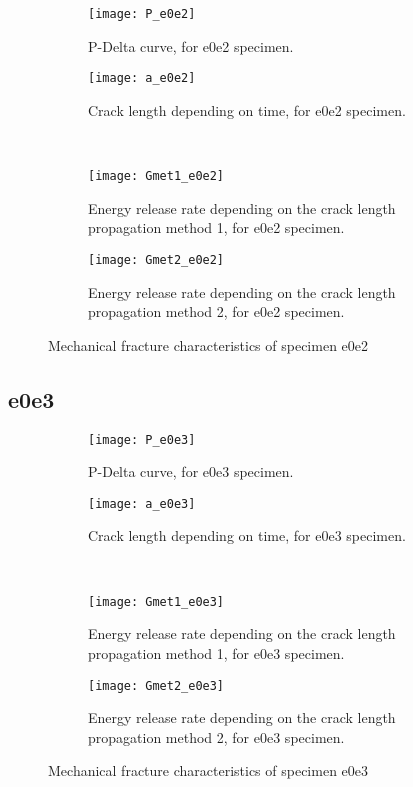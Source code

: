 \begin{figure}[H]
	\centering
	\begin{subfigure}{0.48\linewidth}
		\centering
		\texttt{[image: P\_e0e2]}
		\decoRule
		\caption{P-Delta curve, for e0e2 specimen.}
		\label{fig:P_e0e2}
	\end{subfigure}
	\hfill 
	\begin{subfigure}{0.48\linewidth}
		\centering
		\texttt{[image: a\_e0e2]}
		\decoRule
		\caption{Crack length depending on time, for e0e2 specimen.}
		\label{fig:a_e0e2}
	\end{subfigure}
	\hfill\\
	\begin{subfigure}{0.48\linewidth}
		\centering
		\texttt{[image: Gmet1\_e0e2]}
		\decoRule
		\caption{Energy release rate depending on the crack length propagation method 1, for e0e2 specimen.}
		\label{fig:Gmet1_e0e2}
	\end{subfigure}
	\hfill
	\begin{subfigure}{0.48\linewidth}
		\centering
		\texttt{[image: Gmet2\_e0e2]}
		\decoRule
		\caption{Energy release rate depending on the crack length propagation method 2, for e0e2 specimen.}
		\label{fig:Gmet2_e0e2}
	\end{subfigure}
	\caption{Mechanical fracture characteristics of specimen e0e2}
	\label{E1o_a}
\end{figure}

\subsection{e0e3}

\begin{figure}[H]
	\centering
	\begin{subfigure}{0.48\linewidth}
		\centering
		\texttt{[image: P\_e0e3]}
		\decoRule
		\caption{P-Delta curve, for e0e3 specimen.}
		\label{fig:P_e0e3}
	\end{subfigure}
	\hfill 
	\begin{subfigure}{0.48\linewidth}
		\centering
		\texttt{[image: a\_e0e3]}
		\decoRule
		\caption{Crack length depending on time, for e0e3 specimen.}
		\label{fig:a_e0e3}
	\end{subfigure}
	\hfill\\
	\begin{subfigure}{0.48\linewidth}
		\centering
		\texttt{[image: Gmet1\_e0e3]}
		\decoRule
		\caption{Energy release rate depending on the crack length propagation method 1, for e0e3 specimen.}
		\label{fig:Gmet1_e0e3}
	\end{subfigure}
	\hfill
	\begin{subfigure}{0.48\linewidth}
		\centering
		\texttt{[image: Gmet2\_e0e3]}
		\decoRule
		\caption{Energy release rate depending on the crack length propagation method 2, for e0e3 specimen.}
		\label{fig:Gmet2_e0e3}
	\end{subfigure}
	\caption{Mechanical fracture characteristics of specimen e0e3}
	\label{E1o_a}
\end{figure}

